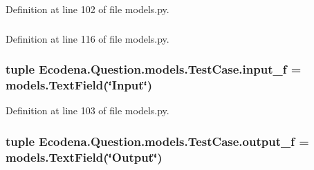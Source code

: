 Definition at line 102 of file models.py.

\hypertarget{class_ecodena_1_1_question_1_1models_1_1_test_case_a80958774ad2d97cb0fabfa415e005000}{
\subsubsection[{caseType\_\-f}]{}}
\label{d4/d96/class_ecodena_1_1_question_1_1models_1_1_test_case_a80958774ad2d97cb0fabfa415e005000}


Definition at line 116 of file models.py.

\hypertarget{class_ecodena_1_1_question_1_1models_1_1_test_case_aeb7c46e67e81b2ca870c79c8968fcdcf}{
\subsubsection[{input\_\-f}]{\setlength{\rightskip}{0pt plus 5cm}tuple {\bf Ecodena.Question.models.TestCase.input\_\-f} = models.TextField(\char`\"{}Input\char`\"{})}}
\label{d4/d96/class_ecodena_1_1_question_1_1models_1_1_test_case_aeb7c46e67e81b2ca870c79c8968fcdcf}


Definition at line 103 of file models.py.

\hypertarget{class_ecodena_1_1_question_1_1models_1_1_test_case_a1bec76507b23217cbf131c113623cad9}{
\subsubsection[{output\_\-f}]{\setlength{\rightskip}{0pt plus 5cm}tuple {\bf Ecodena.Question.models.TestCase.output\_\-f} = models.TextField(\char`\"{}Output\char`\"{})}}
\label{d4/d96/class_ecodena_1_1_question_1_1models_1_1_test_case_a1bec76507b23217cbf131c113623cad9}


